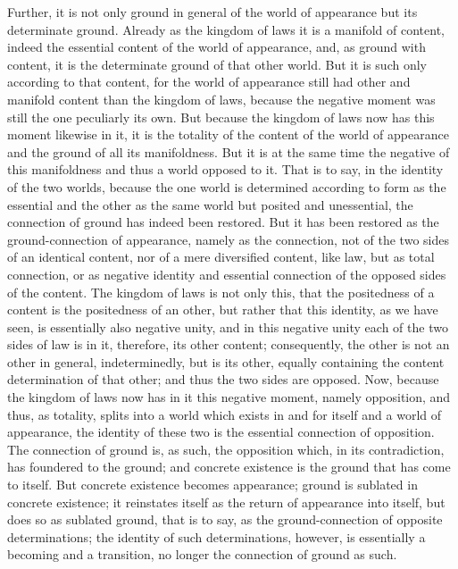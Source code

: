 Further, it is not only ground in general
of the world of appearance but its determinate ground.
Already as the kingdom of laws it is a manifold of content,
indeed the essential content of the world of appearance,
and, as ground with content, it is
the determinate ground of that other world.
But it is such only according to that content,
for the world of appearance still had other
and manifold content than the kingdom of laws,
because the negative moment was still the one peculiarly its own.
But because the kingdom of laws now has this moment likewise in it,
it is the totality of the content of the world of appearance
and the ground of all its manifoldness.
But it is at the same time the negative of
this manifoldness and thus a world opposed to it.
That is to say, in the identity of the two worlds,
because the one world is determined
according to form as the essential
and the other as the same world
but posited and unessential,
the connection of ground has indeed been restored.
But it has been restored as the ground-connection of appearance,
namely as the connection,
not of the two sides of an identical content,
nor of a mere diversified content, like law,
but as total connection,
or as negative identity and essential connection
of the opposed sides of the content.
The kingdom of laws is not only this,
that the positedness of a content
is the positedness of an other,
but rather that this identity, as we have seen,
is essentially also negative unity,
and in this negative unity
each of the two sides of law is in it,
therefore, its other content;
consequently, the other is not
an other in general, indeterminedly,
but is its other, equally containing
the content determination of that other;
and thus the two sides are opposed.
Now, because the kingdom of laws now has in it
this negative moment, namely opposition,
and thus, as totality, splits into a world
which exists in and for itself and a world of appearance,
the identity of these two is
the essential connection of opposition.
The connection of ground is, as such, the opposition
which, in its contradiction, has foundered to the ground;
and concrete existence is the ground that has come to itself.
But concrete existence becomes appearance;
ground is sublated in concrete existence;
it reinstates itself as the return of appearance into itself,
but does so as sublated ground, that is to say,
as the ground-connection of opposite determinations;
the identity of such determinations, however, is
essentially a becoming and a transition,
no longer the connection of ground as such.

